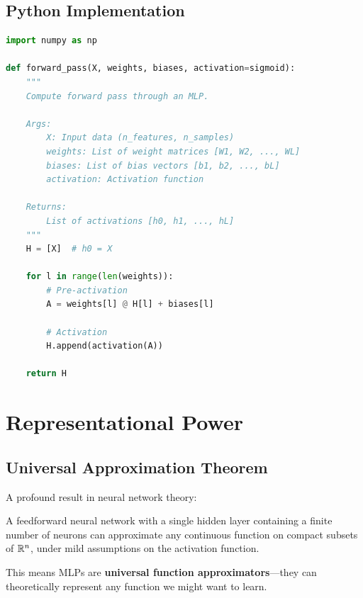 \subsection{Python Implementation}

\begin{lstlisting}[language=Python, caption=Forward Propagation]
import numpy as np

def forward_pass(X, weights, biases, activation=sigmoid):
    """
    Compute forward pass through an MLP.
    
    Args:
        X: Input data (n_features, n_samples)
        weights: List of weight matrices [W1, W2, ..., WL]
        biases: List of bias vectors [b1, b2, ..., bL]
        activation: Activation function
    
    Returns:
        List of activations [h0, h1, ..., hL]
    """
    H = [X]  # h0 = X
    
    for l in range(len(weights)):
        # Pre-activation
        A = weights[l] @ H[l] + biases[l]
        
        # Activation
        H.append(activation(A))
    
    return H
\end{lstlisting}


\section{Representational Power}

\subsection{Universal Approximation Theorem}

A profound result in neural network theory:

\begin{theorembox}
A feedforward neural network with a single hidden layer containing a finite number of neurons can approximate any continuous function on compact subsets of $\mathbb{R}^n$, under mild assumptions on the activation function.
\end{theorembox}

This means MLPs are \textbf{universal function approximators}---they can theoretically represent any function we might want to learn.


